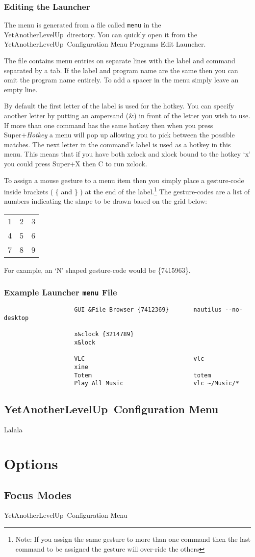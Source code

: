 \documentclass[a4paper,11pt]{article}
\newcommand{\yalu}{YetAnotherLevelUp}
\begin{document}
			\subsubsection{Editing the Launcher}
				The menu is generated from a file called \texttt{menu} in the \yalu\
				directory. You can quickly open it from the \yalu\ Configuration Menu
				\ra Programs \ra Edit Launcher.
				
				The file contains menu entries on separate lines with the label and
				command separated by a tab. If the label and program name are the same
				then you can omit the program name entirely. To add a spacer in the menu
				simply leave an empty line.
				
				By default the first letter of the label is used for the hotkey. You can
				specify another letter by putting an ampersand (\&) in front of the
				letter you wish to use. If more than one command has the same hotkey
				then when you press Super+\emph{Hotkey} a menu will pop up allowing you
				to pick between the possible matches. The next letter in
				the command's label is used as a hotkey in this menu. This means that if
				you have both xclock and xlock bound to the hotkey `x' you could press
				Super+X then C to run xclock.
				
				To assign a mouse gesture to a menu item then you simply place a
				gesture-code inside brackets ( \{ and \} ) at the end of the
				label.\footnote{Note: If you assign the same gesture to more than one
				command then the last command to be assigned the gesture will over-ride
				the others} The gesture-codes are a list of numbers indicating the shape
				to be drawn based on the grid below:
				\begin{longtable}{c c c}
					1 & 2 & 3 \\
					4 & 5 & 6 \\
					7 & 8 & 9 \\
				\end{longtable}
				For example, an `N' shaped gesture-code would be \{7415963\}.
				
			\subsubsection{Example Launcher \texttt{menu} File}
				\begin{verbatim}
					GUI &File Browser {7412369}       nautilus --no-desktop
					
					x&clock {3214789}
					x&lock
					
					VLC                               vlc
					xine
					Totem                             totem
					Play All Music                    vlc ~/Music/*
				\end{verbatim}
		
		\subsection{\yalu\ Configuration Menu}
			Lalala
	
	\section{Options}
		\subsection{Focus Modes}
			\yalu\ Configuration Menu
\end{document}
